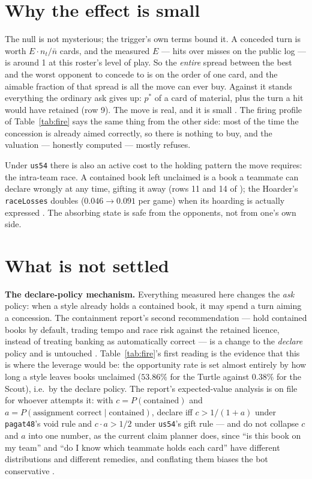 \documentclass[11pt]{article}
\newcommand{\code}[1]{\texttt{#1}}
\begin{document}
\section{Why the effect is small}
\label{sec:small}

The null is not mysterious; the trigger's own terms bound it. A conceded turn
is worth $E \cdot n_t/\bar{n}$ cards, and the measured $E$ --- hits over
misses on the public log --- is around 1 at this roster's level of play. So
the \emph{entire} spread between the best and the worst opponent to concede
to is on the order of one card, and the aimable fraction of that spread is
all the move can ever buy. Against it stands everything the ordinary ask
gives up: $p^{*}$ of a card of material, plus the turn a hit would have
retained (row 9). The move is real, and it is small \cite{styles}. The
firing profile of Table~\ref{tab:fire} says the same thing from the other
side: most of the time the concession is already aimed correctly, so there is
nothing to buy, and the valuation --- honestly computed --- mostly refuses.

Under \code{us54} there is also an active cost to the holding pattern the
move requires: the intra-team race. A contained book left unclaimed is a book
a teammate can declare wrongly at any time, gifting it away (rows 11 and 14
of \cite{rules54}); the Hoarder's \code{raceLosses} doubles ($0.046 \to
0.091$ per game) when its hoarding is actually expressed \cite{styles}. The
absorbing state is safe from the opponents, not from one's own side.

\section{What is not settled}
\label{sec:open}

\textbf{The declare-policy mechanism.} Everything measured here changes the
\emph{ask} policy: when a style already holds a contained book, it may spend
a turn aiming a concession. The containment report's second recommendation
--- hold contained books by default, trading tempo and race risk against the
retained licence, instead of treating banking as automatically correct ---
is a change to the \emph{declare} policy and is untouched
\cite{containment,styles}. Table~\ref{tab:fire}'s first reading is the
evidence that this is where the leverage would be: the opportunity rate is
set almost entirely by how long a style leaves books unclaimed ($53.86\%$
for the Turtle against $0.38\%$ for the Scout), i.e.\ by the declare policy.
The report's expected-value analysis is on file for whoever attempts it:
with $c = P(\text{contained})$ and
$a = P(\text{assignment correct} \mid \text{contained})$, declare iff
$c > 1/(1+a)$ under \code{pagat48}'s void rule and $c \cdot a > 1/2$ under
\code{us54}'s gift rule --- and do not collapse $c$ and $a$ into one number,
as the current claim planner does, since ``is this book on my team'' and
``do I know which teammate holds each card'' have different distributions
and different remedies, and conflating them biases the bot conservative
\cite{containment}.
\end{document}
